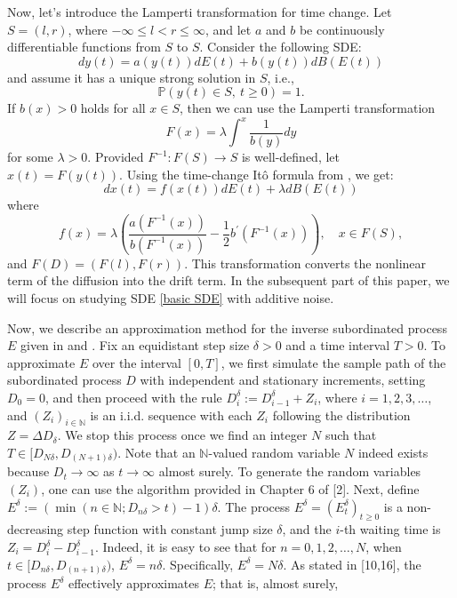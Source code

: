 \documentclass[10pt,reqno,final]{amsart}
\theoremstyle{plain}
\theoremstyle{definition}
\theoremstyle{remark}
\numberwithin{equation}{section}
\numberwithin{figure}{section}
\numberwithin{table}{section}
\begin{document}
Now, let's introduce the Lamperti transformation for time change. 
Let \( S = (l, r) \), where \( -\infty \leq l < r \leq \infty \), and let \( a \) and \( b \) be continuously differentiable functions from \( S \) to \( S \). Consider the following SDE:
\begin{equation}\label{original SDE}
	dy(t) = a(y(t))dE(t) + b(y(t))dB(E(t))
\end{equation}
and assume it has a unique strong solution in \( S \), i.e.,
$$
\mathbb{P}(y(t) \in S, \: t \geq 0) = 1.
$$
If \( b(x) > 0 \) holds for all \( x \in S \), then we can use the Lamperti transformation
\begin{equation}\label{Lamperti}
	F(x) = \lambda \int^x \frac{1}{b(y)} dy
\end{equation}
for some \( \lambda > 0 \). Provided \( F^{-1}: F(S) \to S \) is well-defined, let \( x(t) = F(y(t)) \). Using the time-change Itô formula from \cite{umarov2018beyond}, we get:
\begin{equation}\label{basic SDE}
	dx(t) = f(x(t)) dE(t) + \lambda dB(E(t))
\end{equation}
where
$$
f(x) = \lambda \left( \frac{a(F^{-1}(x))}{b(F^{-1}(x))} - \frac{1}{2} b^{\prime}(F^{-1}(x)) \right), \quad x \in F(S),
$$
and \( F(D) = (F(l), F(r)) \). This transformation converts the nonlinear term of the diffusion into the drift term. In the subsequent part of this paper, we will focus on studying SDE \eqref{basic SDE} with additive noise.

Now, we describe an approximation method for the inverse subordinated process \( E \) given in  \cite{magdziarz2009langevin} and \cite{magdziarz2009stochastic}. Fix an equidistant step size \(\delta > 0\) and a time interval \( T > 0 \). To approximate \( E \) over the interval \([0, T]\), we first simulate the sample path of the subordinated process \( D \) with independent and stationary increments, setting \( D_0 = 0 \), and then proceed with the rule \( D_i^\delta := D_{i-1}^\delta + Z_i \), where \( i = 1, 2, 3, \ldots \), and \( (Z_i)_{i \in \mathbb{N}} \) is an i.i.d. sequence with each \( Z_i \) following the distribution \( Z = \Delta D_\delta \). We stop this process once we find an integer \( N \) such that \( T \in [D_{N\delta}, D_{(N+1)\delta}) \). Note that an \(\mathbb{N}\)-valued random variable \( N \) indeed exists because \( D_t \to \infty \) as \( t \to \infty \) almost surely. To generate the random variables \( (Z_i) \), one can use the algorithm provided in Chapter 6 of [2]. Next, define \( E^\delta := (\min(n \in \mathbb{N}; D_{n\delta} > t) - 1) \delta \). The process \( E^\delta = (E_t^\delta)_{t \geq 0} \) is a non-decreasing step function with constant jump size \(\delta\), and the \( i \)-th waiting time is \( Z_i = D_i^\delta - D_{i-1}^\delta \). Indeed, it is easy to see that for \( n = 0, 1, 2, \ldots, N \), when \( t \in [D_{n\delta}, D_{(n+1)\delta}) \), \( E^\delta = n\delta \). Specifically, \( E^\delta = N\delta \). As stated in [10,16], the process \( E^\delta \) effectively approximates \( E \); that is, almost surely,
\end{document}
